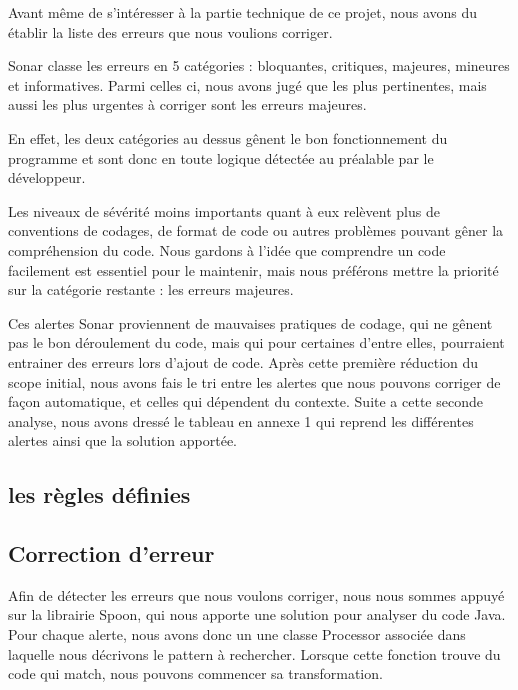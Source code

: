 \documentclass[a4paper]{article}
\begin{document}
\par Avant même de s'intéresser à la partie technique de ce projet, nous avons du établir la liste des erreurs que nous voulions corriger.
\\
\par Sonar classe les erreurs en 5 catégories : bloquantes, critiques, majeures, mineures et informatives. Parmi celles ci, nous avons jugé que les plus pertinentes, mais aussi les plus urgentes à corriger sont les erreurs majeures.
\\
\par En effet, les deux catégories au dessus gênent le bon fonctionnement du programme et sont donc en toute logique détectée au préalable par le développeur.
\\
\par Les niveaux de sévérité moins importants quant à eux relèvent plus de conventions de codages, de format de code ou autres problèmes pouvant gêner la compréhension du code. Nous gardons à l'idée que comprendre un code facilement est essentiel pour le maintenir, mais nous préférons mettre la priorité sur la catégorie restante : les erreurs majeures.
\\
\par Ces alertes Sonar proviennent de mauvaises pratiques de codage, qui ne gênent pas le bon déroulement du code, mais qui pour certaines d'entre elles, pourraient entrainer des erreurs lors d'ajout de code. Après cette première réduction du scope initial, nous avons fais le tri entre les alertes que nous pouvons corriger de façon automatique, et celles qui dépendent du contexte. Suite a cette seconde analyse, nous avons dressé le tableau en annexe 1 qui reprend les différentes alertes ainsi que la solution apportée.

\subsection{les règles définies}

\subsection{Correction d'erreur}
\par Afin de détecter les erreurs que nous voulons corriger, nous nous sommes appuyé sur la librairie Spoon, qui nous apporte une solution pour analyser du code Java. Pour chaque alerte, nous avons donc un une classe Processor associée dans laquelle nous décrivons le pattern à rechercher. Lorsque cette fonction trouve du code qui match, nous pouvons commencer sa transformation.
\end{document}
